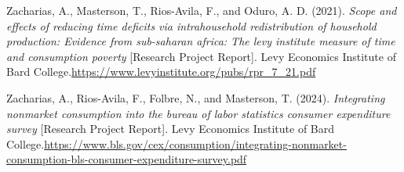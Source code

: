 \documentclass[
  11pt,
]{article}
\newlength{\cslhangindent}
\newenvironment{CSLReferences}[2] %
 {\begin{list}{}{%
  \setlength{\itemindent}{0pt}
  \setlength{\leftmargin}{0pt}
  \setlength{\parsep}{0pt}
  \ifodd #1
   \setlength{\leftmargin}{\cslhangindent}
   \setlength{\itemindent}{-1\cslhangindent}
  \fi
  \setlength{\itemsep}{#2\baselineskip}}}
 {\end{list}}
\begin{document}
\begin{CSLReferences}{1}{0}
Zacharias, A., Masterson, T., Rios-Avila, F., and Oduro, A. D. (2021).
\emph{Scope and effects of reducing time deficits via intrahousehold
redistribution of household production: Evidence from sub-saharan
africa: The levy institute measure of time and consumption poverty}
{[}Research Project Report{]}. Levy Economics Institute of Bard
College.\href{\%20https://www.levyinstitute.org/pubs/rpr_7_21.pdf}{https://www.levyinstitute.org/pubs/rpr\_7\_21.pdf}

Zacharias, A., Rios-Avila, F., Folbre, N., and Masterson, T. (2024).
\emph{Integrating nonmarket consumption into the bureau of labor
statistics consumer expenditure survey} {[}Research Project Report{]}.
Levy Economics Institute of Bard
College.\href{\%20https://www.bls.gov/cex/consumption/integrating-nonmarket-consumption-bls-consumer-expenditure-survey.pdf}{https://www.bls.gov/cex/consumption/integrating-nonmarket-consumption-bls-consumer-expenditure-survey.pdf}

\end{CSLReferences}
\end{document}
